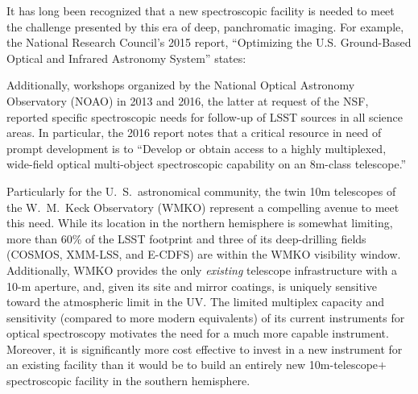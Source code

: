 \documentclass[11pt,a4paper,twoside,onecolumn,openany,final,oldfontcommands]{memoir}
\begin{document}
It has long been recognized that a new spectroscopic facility is needed to meet the challenge presented by this era of deep, panchromatic imaging. For example, the National Research Council's 2015 report, ``Optimizing the U.S. Ground-Based Optical and Infrared Astronomy System'' \citep{NAP21722} states:
%
\noindent{}
%
Additionally, workshops organized by the National Optical Astronomy Observatory (NOAO) in 2013 and 2016, the latter at request of the NSF, reported specific spectroscopic needs for follow-up of LSST sources in all science areas.  In particular, the 2016 report notes that a critical resource in need of prompt development is to ``Develop or obtain access to a highly multiplexed, wide-field optical multi-object spectroscopic capability on an 8m-class telescope.''

Particularly for the U.~S.\ astronomical community, the twin 10m telescopes of the W.~M.~Keck Observatory (WMKO) represent a compelling avenue to meet this need.  While its location in the northern hemisphere is somewhat limiting, more than 60\% of the LSST footprint and three of its deep-drilling fields (COSMOS, XMM-LSS, and E-CDFS) are within the WMKO visibility window.    Additionally, WMKO provides the only \textit{existing} telescope infrastructure with a 10-m aperture, and, given its site and mirror coatings, is uniquely sensitive toward the atmospheric limit in the UV.  The limited multiplex capacity and sensitivity (compared to more modern equivalents) of its current instruments for optical spectroscopy motivates the need for a much more capable instrument.  Moreover, it is significantly more cost effective to invest in a new instrument for an existing facility than it would be to build an entirely new 10m-telescope$+$spectroscopic facility in the southern hemisphere.
\end{document}
